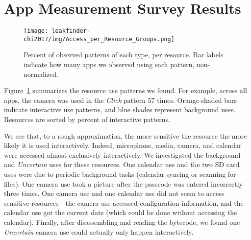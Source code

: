 
\section{App Measurement Survey Results}

\begin{figure}[t]
\centering %
\texttt{[image: leakfinder-chi2017/img/Access\_per\_Resource\_Groups.png]}
\caption{Percent of observed patterns of each type, per resource. 
Bar labels indicate how many apps
  we observed using each pattern, non-normalized.}
\label{fig:access_per_resource}
\end{figure}

Figure~\ref{fig:access_per_resource} summarizes the resource use
patterns we found. For example, across all
apps, the camera was used in the \emph{Click} pattern 57 times. Orange-shaded 
bars indicate interactive use patterns, and 
blue shades represent background uses.  Resources are sorted 
by percent of interactive patterns.

We see that, to a rough approximation, the more sensitive the resource
the more likely it is used interactively. Indeed, microphone, media,
camera, and calendar were accessed almost exclusively
interactively. We investigated the background and \emph{Uncertain}
uses for these resources. One calendar use and the two SD card uses
were due to periodic background tasks (calendar syncing or scanning
for files). One camera use took a picture after the passcode was
entered incorrectly three times. One camera use and one calendar use
did not seem to access sensitive resources---the camera use accessed 
configuration information, and the calendar use got the current date
(which could be done without accessing the calendar). Finally, after
disassembling and reading the bytecode, we found one \emph{Uncertain} 
camera use could actually only happen interactively.


